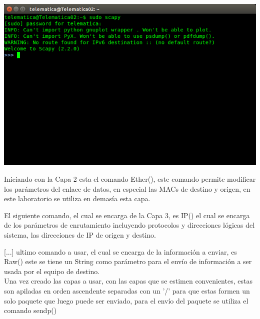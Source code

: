 \documentclass[spanish]{udpreport}
\begin{document}
\begin{center}
	\includegraphics[scale=.37]{imagenes/Scapy_Init.png}
\end{center}

Iniciando con la Capa 2 esta el comando Ether(), este comando permite modificar los parámetros del enlace de datos, en especial las MACs de destino y origen, en este laboratorio se utiliza en demasía esta capa.


El siguiente comando, el cual se encarga de la Capa 3, es IP() el cual se encarga de los parámetros de enrutamiento incluyendo protocolos y direcciones lógicas del sistema, las direcciones de IP de origen y destino.



[...] ultimo comando a usar, el cual se encarga de la información a enviar, es Raw() este se tiene un String como parámetro para el envío de información a ser usada por el equipo de destino.
\\

Una vez creado las capas a usar, con las capas que se estimen convenientes, estas son apiladas en orden ascendente separadas con un '/' para que estas formen un solo paquete que luego puede ser enviado, para el envío del paquete se utiliza el comando sendp() %


\newpage
\end{document}
